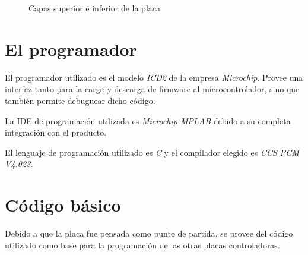 \documentclass[a4paper,10pt]{article}
\begin{document}
\begin{figure}
\caption{Capas superior e inferior de la placa}
\label{capas}
\end{figure}


\section{El programador}
\label{programador}

El programador utilizado es el modelo \emph{ICD2} de la empresa \emph{Microchip}.
Provee una interfaz tanto para la carga y descarga de firmware al microcontrolador, sino que tambi\'en permite debuguear dicho c\'odigo.

La IDE de programaci\'on utilizada es \emph{Microchip MPLAB} debido a su completa integraci\'on con el producto.

El lenguaje de programaci\'on utilizado es \emph{C} y el compilador elegido es \emph{CCS PCM V4.023}.

\section{C\'odigo b\'asico}
\label{codigo}

Debido a que la placa fue pensada como punto de partida, se provee del c\'odigo utilizado como base para la programaci\'on de las otras placas controladoras.
\end{document}
